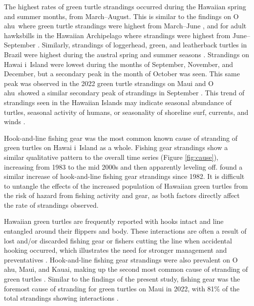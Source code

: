 \documentclass[sn-basic,NameDate]{sn-jnl}\usepackage[]{graphicx}\usepackage[]{xcolor}
\DeclareRobustCommand{\okina}{%
  \raisebox{\dimexpr\fontcharht\font`A-\height}{%
    \scalebox{0.8}{`}%
  }%
}
\newcommand{\Hawaii}{Hawai\okina i}
\newcommand{\Oahu}{O\okina ahu}
\begin{document}
The highest rates of green turtle strandings occurred during the Hawaiian spring and summer months, from March--August.
This is similar to the findings on \Oahu\ where green turtle strandings were highest from March--June \citep{chaloupka2008cause}, and for adult hawksbills in the Hawaiian Archipelago where strandings were highest from June--September \citep{brunson2022three}. 
Similarly, strandings of loggerhead, green, and leatherback turtles in Brazil were highest during the austral spring and summer seasons \citep{monteiro2016long}. 
Strandings on \Hawaii\ Island were lowest during the months of September, November, and December, but a secondary peak in the month of October was seen.
This same peak was observed in the 2022 green turtle strandings on Maui \citep{cutt2023impact} and
\Oahu\ showed a similar secondary peak of strandings in September \citep{chaloupka2008cause}. 
This trend of strandings seen in the Hawaiian Islands may indicate seasonal abundance of turtles, seasonal activity of humans, or seasonality of shoreline surf, currents, and winds \citep{chaloupka2008cause}.

Hook-and-line fishing gear was the most common known cause of stranding of green turtles on \Hawaii\ Island as a whole.
Fishing gear strandings show a similar qualitative pattern to the overall time series (Figure \ref{fig:cause}), increasing from 1983 to the mid 2000s and then apparently leveling off. 
\cite{chaloupka2008cause} found a similar increase of hook-and-line fishing gear strandings since 1982.
It is difficult to untangle the effects of the increased population of Hawaiian green turtles from the risk of hazard from fishing activity and gear, as both factors directly affect the rate of strandings observed.

Hawaiian green turtles are frequently reported with hooks intact and line entangled around their flippers and body. 
These interactions are often a result of lost and/or discarded fishing gear or fishers cutting the line when accidental hooking occurred, which illustrates the need for stronger management and preventatives \citep{nitta1993review}. 
Hook-and-line fishing gear strandings were also prevalent on \Oahu, Maui, and Kauai, making up the second most common cause of stranding of green turtles \citep{chaloupka2008cause}.
Similar to the findings of the present study, fishing gear was the foremost cause of stranding for green turtles on Maui in 2022, with 81\% of the total strandings showing interactions \citep{cutt2023impact}.
\end{document}
